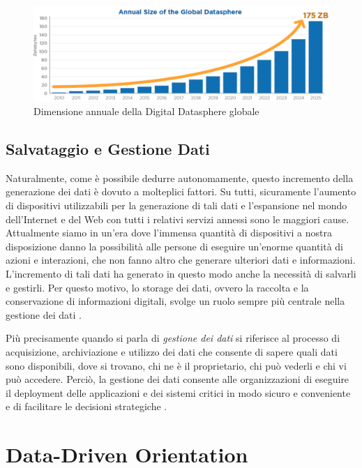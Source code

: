 \begin{figure}[!h]
    \centering
    \includegraphics[width=1\linewidth]{figure/capitolo_1/Annual Size Global Datasphere.pdf}
    \caption{Dimensione annuale della Digital Datasphere globale}
    \label{fig:Annual Size Global Datasphere}
\end{figure}

\subsection{Salvataggio e Gestione Dati}

Naturalmente, come è possibile dedurre autonomamente, questo incremento della generazione dei dati è dovuto a molteplici fattori. Su tutti, sicuramente l'aumento di dispositivi utilizzabili per la generazione di tali dati e l'espansione nel mondo dell'Internet e del Web con tutti i relativi servizi annessi sono le maggiori cause. Attualmente siamo in un'era dove l'immensa quantità di dispositivi a nostra disposizione danno la possibilità alle persone di eseguire un'enorme quantità di azioni e interazioni, che non fanno altro che generare ulteriori dati e informazioni. L'incremento di tali dati ha generato in questo modo anche la necessità di salvarli e gestirli. Per questo motivo, lo storage dei dati, ovvero la raccolta e la conservazione di informazioni digitali, svolge un ruolo sempre più centrale nella gestione dei dati \cite{redhat_data_storage}.

Più precisamente quando si parla di \textit{gestione dei dati} si riferisce al processo di acquisizione, archiviazione e utilizzo dei dati che consente di sapere quali dati sono disponibili, dove si trovano, chi ne è il proprietario, chi può vederli e chi vi può accedere. Perciò, la gestione dei dati consente alle organizzazioni di eseguire il deployment delle applicazioni e dei sistemi critici in modo sicuro e conveniente e di facilitare le decisioni strategiche \cite{redhat_data_management}.

\section{Data-Driven Orientation}

